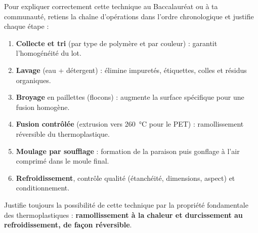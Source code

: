 \documentclass[11pt]{article}
\begin{document}
\begin{methode}
Pour expliquer correctement cette technique au Baccalauréat ou à ta communauté, retiens la chaîne d'opérations dans l'ordre chronologique et justifie chaque étape :
\begin{enumerate}
\item \textbf{Collecte et tri} (par type de polymère et par couleur) : garantit l'homogénéité du lot.
\item \textbf{Lavage} (eau + détergent) : élimine impuretés, étiquettes, colles et résidus organiques.
\item \textbf{Broyage} en paillettes (flocons) : augmente la surface spécifique pour une fusion homogène.
\item \textbf{Fusion contrôlée} (extrusion vers \SI{260}{\celsius} pour le PET) : ramollissement réversible du thermoplastique.
\item \textbf{Moulage par soufflage} : formation de la paraison puis gonflage à l'air comprimé dans le moule final.
\item \textbf{Refroidissement}, contrôle qualité (étanchéité, dimensions, aspect) et conditionnement.
\end{enumerate}
Justifie toujours la possibilité de cette technique par la propriété fondamentale des thermoplastiques : \textbf{ramollissement à la chaleur et durcissement au refroidissement, de façon réversible}.
\end{methode}
\end{document}

